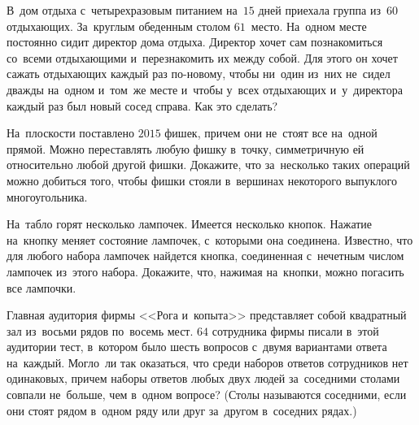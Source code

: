 \begin{problems}
\item
В~дом отдыха с~четырехразовым питанием на~$15$ дней приехала группа из~$60$
отдыхающих.
За~круглым обеденным столом $61$~место.
На~одном месте постоянно сидит директор дома отдыха.
Директор хочет сам познакомиться со~всеми отдыхающими и~перезнакомить их между
собой.
Для этого он хочет сажать отдыхающих каждый раз по-новому, чтобы ни~один из~них
не~сидел дважды на~одном и~том~же месте и~чтобы у~всех отдыхающих и~у~директора
каждый раз был новый сосед справа.
Как это сделать?

\item
На~плоскости поставлено $2015$ фишек, причем они не~стоят все на~одной прямой.
Можно переставлять любую фишку в~точку, симметричную ей относительно любой
другой фишки.
Докажите, что за~несколько таких операций можно добиться того, чтобы фишки
стояли в~вершинах некоторого выпуклого многоугольника.

\item
На~табло горят несколько лампочек.
Имеется несколько кнопок.
Нажатие на~кнопку меняет состояние лампочек, с~которыми она соединена.
Известно, что для любого набора лампочек найдется кнопка, соединенная
с~нечетным числом лампочек из~этого набора.
Докажите, что, нажимая на~кнопки, можно погасить все лампочки.

\item
Главная аудитория фирмы <<Рога и~копыта>> представляет собой квадратный зал
из~восьми рядов по~восемь мест.
$64$ сотрудника фирмы писали в~этой аудитории тест, в~котором было шесть
вопросов с~двумя вариантами ответа на~каждый.
Могло~ли так оказаться, что среди наборов ответов сотрудников нет одинаковых,
причем наборы ответов любых двух людей за~соседними столами совпали не~больше,
чем в~одном вопросе?
(Столы называются соседними, если они стоят рядом в~одном ряду или друг
за~другом в~соседних рядах.)

\end{problems}

